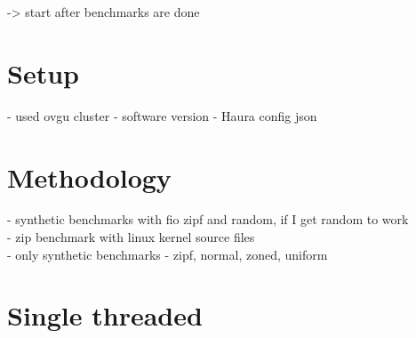 \documentclass[
	12pt,
	a4paper,
	abstract,
	bibliography=totoc,
	chapterprefix,
	headings=openright,
	numbers=endperiod,
	parskip=half,
	twoside,
]{scrreprt}
\begin{document}

-> start after benchmarks are done

\section{Setup}

- used ovgu cluster
- software version 
- Haura config json


\section{Methodology}
- synthetic benchmarks with fio zipf and random, if I get random to work\\
- zip benchmark with linux kernel source files\\
- only synthetic benchmarks 
- zipf, normal, zoned, uniform 


\section{Single threaded}
\end{document}
